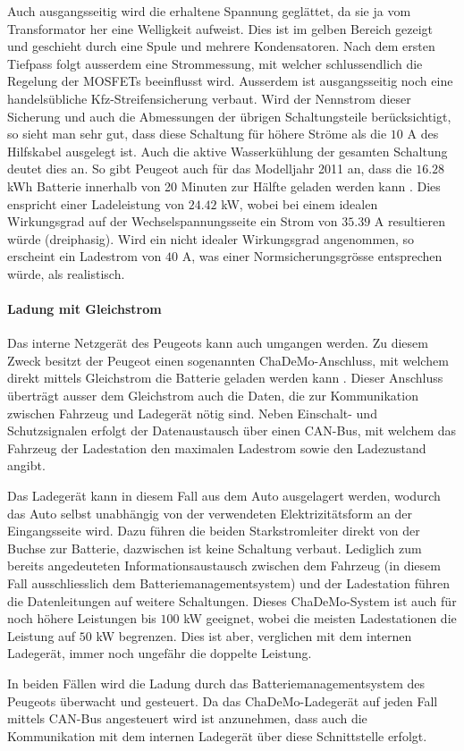 Auch ausgangsseitig wird die erhaltene Spannung geglättet, da sie ja vom Transformator her eine Welligkeit aufweist. Dies ist im gelben Bereich gezeigt und geschieht durch eine Spule und mehrere Kondensatoren. Nach dem ersten Tiefpass folgt ausserdem eine Strommessung, mit welcher schlussendlich die Regelung der MOSFETs beeinflusst wird. Ausserdem ist ausgangsseitig noch eine handelsübliche Kfz-Streifensicherung verbaut. Wird der Nennstrom dieser Sicherung und auch die Abmessungen der übrigen Schaltungsteile berücksichtigt, so sieht man sehr gut, dass diese Schaltung für höhere Ströme als die $10$ A des Hilfskabel ausgelegt ist. Auch die aktive Wasserkühlung der gesamten Schaltung deutet dies an. So gibt Peugeot auch für das Modelljahr 2011 an, dass die $16.28$ kWh Batterie innerhalb von 20 Minuten zur Hälfte geladen werden kann \cite{ion}. Dies enspricht einer Ladeleistung von $24.42$ kW, wobei bei einem idealen Wirkungsgrad auf der Wechselspannungsseite ein Strom von $35.39$ A resultieren würde (dreiphasig). Wird ein nicht idealer Wirkungsgrad angenommen, so erscheint ein Ladestrom von $40$ A, was einer Normsicherungsgrösse entsprechen würde, als realistisch.

\paragraph{Ladung mit Gleichstrom}
Das interne Netzgerät des Peugeots kann auch umgangen werden. Zu diesem Zweck besitzt der Peugeot einen sogenannten ChaDeMo-Anschluss, mit welchem direkt mittels Gleichstrom die Batterie geladen werden kann \cite{chademo}. Dieser Anschluss überträgt ausser dem Gleichstrom auch die Daten, die zur Kommunikation zwischen Fahrzeug und Ladegerät nötig sind. Neben Einschalt- und Schutzsignalen erfolgt der Datenaustausch über einen CAN-Bus, mit welchem das Fahrzeug der Ladestation den maximalen Ladestrom sowie den Ladezustand angibt.

Das Ladegerät kann in diesem Fall aus dem Auto ausgelagert werden, wodurch das Auto selbst unabhängig von der verwendeten Elektrizitätsform an der Eingangsseite wird. Dazu führen die beiden Starkstromleiter direkt von der Buchse zur Batterie, dazwischen ist keine Schaltung verbaut. Lediglich zum bereits angedeuteten Informationsaustausch zwischen dem Fahrzeug (in diesem Fall ausschliesslich dem Batteriemanagementsystem) und der Ladestation führen die Datenleitungen auf weitere Schaltungen. Dieses ChaDeMo-System ist auch für noch höhere Leistungen bis $100$ kW geeignet, wobei die meisten Ladestationen die Leistung auf $50$ kW begrenzen. Dies ist aber, verglichen mit dem internen Ladegerät, immer noch ungefähr die doppelte Leistung.

In beiden Fällen wird die Ladung durch das Batteriemanagementsystem des Peugeots überwacht und gesteuert. Da das ChaDeMo-Ladegerät auf jeden Fall mittels CAN-Bus angesteuert wird ist anzunehmen, dass auch die Kommunikation mit dem internen Ladegerät über diese Schnittstelle erfolgt.